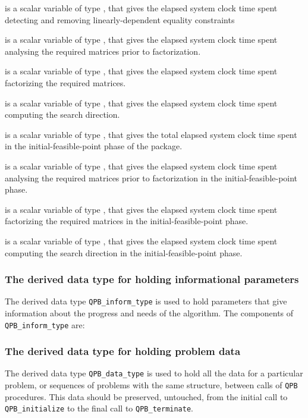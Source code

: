 \documentclass{galahad}
\newcommand{\packagename}{QPB}
\begin{document}
\begin{description}
 is a scalar variable of type \realdp, that 
gives  the elapsed system clock time spent detecting and removing 
linearly-dependent equality  constraints

 is a scalar variable of type \realdp, that gives
 the elapsed system clock time spent analysing the required matrices prior to 
factorization.

 is a scalar variable of type \realdp, that gives
 the elapsed system clock time spent factorizing the required matrices.

 is a scalar variable of type \realdp, that gives
 the elapsed system clock time spent computing the search direction.

 is a scalar variable of type \realdp, that 
gives the total elapsed system clock time spent in the initial-feasible-point 
phase of the package.

 is a scalar variable of type \realdp, that 
gives  the elapsed system clock time spent analysing the required matrices 
prior to factorization  in the initial-feasible-point phase.

 is a scalar variable of type \realdp, that
gives the elapsed system clock time spent factorizing the required matrices
 in the initial-feasible-point phase.

 is a scalar variable of type \realdp, that 
gives the elapsed system clock time spent computing the search direction
 in the initial-feasible-point phase.
\end{description}


\subsubsection{The derived data type for holding informational
 parameters}\label{typeinform}
The derived data type 
{\tt \packagename\_inform\_type} 
is used to hold parameters that give information about the progress and needs 
of the algorithm. The components of 
{\tt \packagename\_inform\_type} 
are:




\subsubsection{The derived data type for holding problem data}\label{typedata}
The derived data type 
{\tt \packagename\_data\_type} 
is used to hold all the data for a particular problem,
or sequences of problems with the same structure, between calls of 
{\tt \packagename} procedures. 
This data should be preserved, untouched, from the initial call to 
{\tt \packagename\_initialize}
to the final call to
{\tt \packagename\_terminate}.
\end{document}
